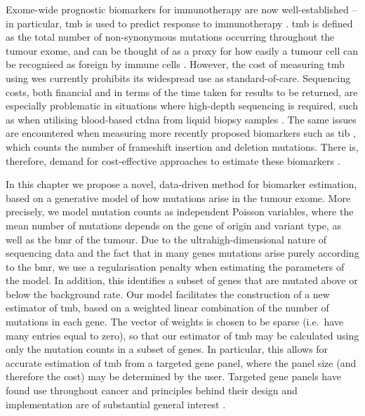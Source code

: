 \documentclass[../thesis.tex]{subfiles}
\begin{document}
Exome-wide prognostic biomarkers for immunotherapy are now well-established -- in particular, \gls{tmb} is used to predict response to immunotherapy \citep{zhu_association_2019, cao_high_2019}.  \gls{tmb} is defined as the total number of non-synonymous mutations occurring throughout the tumour exome, and can be thought of as a proxy for how easily a tumour cell can be recognised as foreign by immune cells \citep{chan_development_2019}. However, the cost of measuring \gls{tmb} using \gls{wes} \citep{sboner_real_2011} currently prohibits its widespread use as standard-of-care.  Sequencing costs, both financial and in terms of the time taken for results to be returned, are especially problematic in situations where high-depth sequencing is required, such as when utilising blood-based \gls{ctdna} from liquid biopsy samples \citep{gandara_blood-based_2018}. The same issues are encountered when measuring more recently proposed biomarkers such as \gls{tib} \citep{wu_tumor_2019,turajlic_insertion-and-deletion-derived_2017}, which counts the number of frameshift insertion and deletion mutations. There is, therefore, demand for cost-effective approaches to estimate these biomarkers \citep{fancello_tumor_2019, golkaram_interplay_2020}.

In this chapter we propose a novel, data-driven method for biomarker estimation, based on a generative model of how mutations arise in the tumour exome.  More precisely, we model mutation counts as independent Poisson variables, where the mean number of mutations depends on the gene of origin and variant type, as well as the \gls{bmr} of the tumour. Due to the ultrahigh-dimensional nature of sequencing data and the fact that in many genes mutations arise purely according to the \gls{bmr}, we use a regularisation penalty when estimating the parameters of the model. In addition, this identifies a subset of genes that are mutated above or below the background rate.  Our model facilitates the construction of a new estimator of \gls{tmb}, based on a weighted linear combination of the number of mutations in each gene. The vector of weights is chosen to be sparse (i.e.~have many entries equal to zero), so that our estimator of \gls{tmb} may be calculated using only the mutation counts in a subset of genes. In particular, this allows for accurate estimation of \gls{tmb} from a targeted gene panel, where the panel size (and therefore the cost) may be determined by the user. Targeted gene panels have found use throughout cancer and principles behind their design and implementation are of substantial general interest \citep{bewicke-copley_applications_2019}.
\end{document}
